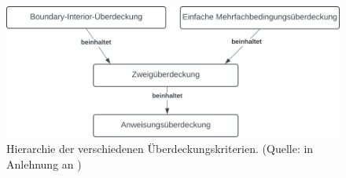 \begin{figure}
    \centering
    \includegraphics[scale=0.4]{part four/Testende Verfahren/img/coverage-criteria-hierarchy}
    \caption{Hierarchie der verschiedenen Überdeckungskriterien. (Quelle: in Anlehnung an \cite[Abb. 5.2, 53]{Wed09c})}
    \label{fig:coverage-criteria-hierarchy-cc}
\end{figure}